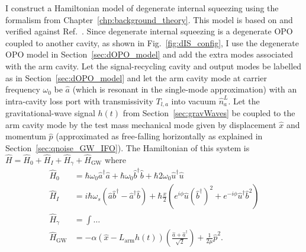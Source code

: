 I construct a Hamiltonian model of degenerate internal squeezing using the formalism from Chapter~\ref{chp:background_theory}. This model is based on and verified against Ref.~\cite{Korobko2019}. %
Since degenerate internal squeezing is a degenerate OPO coupled to another cavity, as shown in Fig.~\ref{fig:dIS_config}, I use the degenerate OPO model in Section~\ref{sec:dOPO_model} and add the extra modes associated with the arm cavity. Let the signal-recycling cavity and output modes be labelled as in Section~\ref{sec:dOPO_model} and let the arm cavity mode at carrier frequency $\omega_0$ be $\hat a$ (which is resonant in the single-mode approximation) with an intra-cavity loss port with transmissivity $T_{l,a}$ into vacuum $\hat n^L_a$. Let the gravitational-wave signal $h(t)$ from Section~\ref{sec:gravWaves} be coupled to the arm cavity mode by the test mass mechanical mode given by displacement $\hat x$ and momentum $\hat p$ (approximated as free-falling horizontally as explained in Section~\ref{sec:qnoise_GW_IFO}). 
The Hamiltonian of this system is $\hat H = \hat H_0 + \hat H_I + \hat H_\gamma + \hat H_\text{GW}$ where~\cite{}
\begin{align}
\hat H_0 &= \hbar \omega_0 \hat a^\dag \hat a + \hbar \omega_0 \hat b^\dag \hat b + \hbar 2\omega_0 \hat u^\dag \hat u\\
\hat H_I &= i\hbar\omega_s(\hat a\hat b^\dag-\hat a^\dag\hat b) +\hbar \frac{x}{2} (e^{i\phi} \hat u (\hat b^\dag)^2 + e^{-i\phi} \hat u^\dag \hat b^2)\\
\hat H_\gamma &= \int \ldots \\
\hat H_\text{GW} &= -\alpha (\hat{x}-L_\mathrm{arm}h(t))\left(\frac{\hat{a}+\hat{a}^\dag}{\sqrt{2}}\right)+\frac{1}{2\mu}\hat{p}^2.
\end{align}
